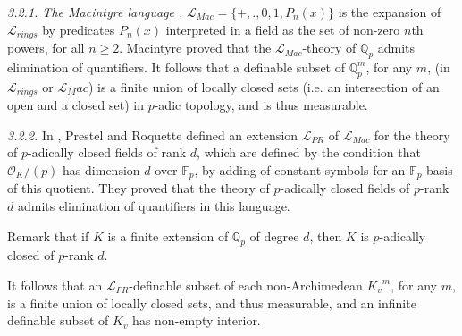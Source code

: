 \documentclass[12pt]{amsart}
\def\F{\mathbb{F}}
\def\cL{\mathcal{L}}
\def\Q{\mathbb{Q}}
\def\F{\mathbb{F}}
\def\cL{\mathcal{L}}
\numberwithin{equation}{section}
\begin{document}
{\it 3.2.1. The Macintyre language \cite{Macintyre1}.} $\mathcal{L}_{Mac}=\{+,.,0,1,P_n(x)\}$ is the expansion of $\cL_{rings}$ by predicates $P_n(x)$ interpreted in a field as the set of non-zero $n$th powers, for all $n\geq 2$. Macintyre \cite{Macintyre1} proved that 
the $\cL_{Mac}$-theory of $\Q_p$ admits elimination of quantifiers. It follows that a definable subset of                                                                                                                                                                                                                                                                                                                                                                                                                                                                                                                                                                                                                                                                                                                                                                                                                                                                                                                                                                                                                                                                                                                                                      $\Q_p^m$, for any $m$, (in $\cL_{rings}$ or $\cL_Mac$) is a finite union of locally closed sets (i.e. an intersection of an open and a closed set) in $p$-adic topology, and is thus measurable. 

\medskip

{\it 3.2.2.} In \cite{PR-book}, Prestel and Roquette defined an extension $\cL_{PR}$ 
of $\cL_{Mac}$ for the theory of $p$-adically closed fields of 
rank $d$, which are defined by the condition that $\mathcal{O}_{K}/(p)$ has dimension $d$ over $\F_p$, by 
adding of constant symbols for an $\F_p$-basis of this quotient. They proved that the theory of $p$-adically closed fields of $p$-rank $d$ admits elimination of quantifiers in this language. 

Remark that if $K$ is a finite 
extension of $\Q_p$ of degree $d$, then $K$ is $p$-adically closed of $p$-rank $d$.  

It follows that an $\cL_{PR}$-definable subset of each non-Archimedean ${K_v}^m$, for any $m$, is a finite union of locally closed sets, and thus measurable, and an infinite definable subset of $K_v$ 
has non-empty interior. 
\end{document}
